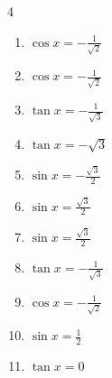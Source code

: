 \begin{multicols}{4}
\begin{enumerate}

  \item $\displaystyle \cos{x}  = -\frac{1}{\sqrt{2}}$


  \item $\displaystyle \cos{x}  = -\frac{1}{\sqrt{2}}$


  \item $\displaystyle \tan{x}  = -\frac{1}{\sqrt{3}}$


  \item $\displaystyle \tan{x}  = -\sqrt{3}$


  \item $\displaystyle \sin{x}  = -\frac{\sqrt{3}}{2}$


  \item $\displaystyle \sin{x}  = \frac{\sqrt{3}}{2}$


\columnbreak %

  \item $\displaystyle \sin{x}  = \frac{\sqrt{3}}{2}$


  \item $\displaystyle \tan{x}  = -\frac{1}{\sqrt{3}}$


  \item $\displaystyle \cos{x}  = -\frac{1}{\sqrt{2}}$


  \item $\displaystyle \sin{x}  = \frac{1}{2}$


  \item $\displaystyle \tan{x}  = 0$


\end{enumerate}
\end{multicols}
